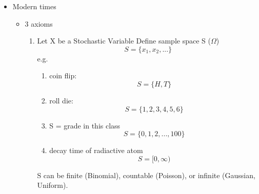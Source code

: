 \begin{itemize}
    \item Modern times
    \begin{itemize}
        \item 3 axioms
        \begin{enumerate}
            \item Let X be a Stochastic Variable
             Define sample space S ($\Omega$)
            \[ S = \{x_1, x_2, ...\}\]
            e.g.
            \begin{enumerate}
                \item coin flip:
                \[S = \{H, T\}\]
                \item roll die:
                \[S = \{1, 2, 3, 4, 5, 6\}\]
                \item S = grade in this class
                \[ S = \{0, 1, 2, ..., 100\}\]
                \item decay time of radiactive atom
                \[ S = [0, \infty)\]
            \end{enumerate}
            S can be finite (Binomial), countable (Poisson), or infinite (Gaussian, Uniform).
            

        \end{enumerate}

    \end{itemize}
\end{itemize}


